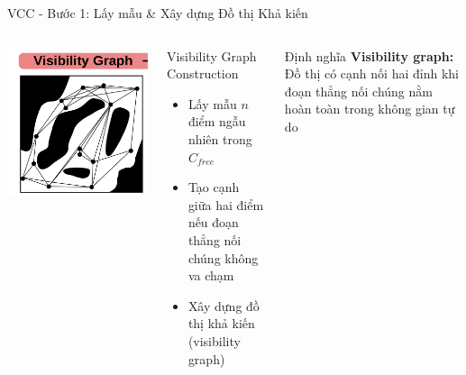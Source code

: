 \documentclass[aspectratio=169]{beamer}
\begin{document}
\begin{frame}{VCC - Bước 1: Lấy mẫu \& Xây dựng Đồ thị Khả kiến}
    \begin{columns}[c]
        \centering
        \includegraphics[width=\textwidth]{../imgs/VCC-1.png}

        \begin{block}{Visibility Graph Construction}
            \small
            \begin{itemize}
                \item Lấy mẫu $n$ điểm ngẫu nhiên trong $C_{free}$
                \item Tạo cạnh giữa hai điểm nếu đoạn thẳng nối chúng không va chạm
                \item Xây dựng đồ thị khả kiến (visibility graph)
            \end{itemize}
        \end{block}

        \begin{exampleblock}{Định nghĩa}
            \small
            \textbf{Visibility graph:} Đồ thị có cạnh nối hai đỉnh khi đoạn thẳng nối chúng nằm hoàn toàn trong không gian tự do
        \end{exampleblock}
    \end{columns}
\end{frame}
\end{document}

